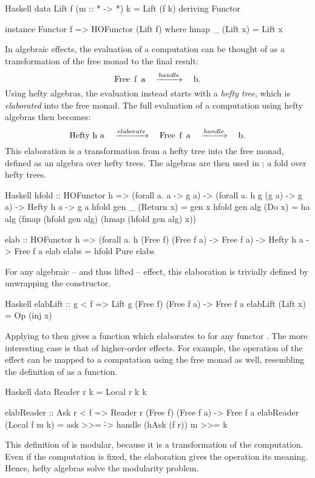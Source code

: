 \begin{lst}{Haskell}
data Lift f (m :: * -> *) k = Lift (f k)
  deriving Functor

instance Functor f => HOFunctor (Lift f) where
  hmap _ (Lift x) = Lift x
\end{lst}
%
In algebraic effects, the evaluation of a computation can be thought of as a transformation of the free monad to the final result: 
\[
    \mcode{Free f a} \quad\xrightarrow{handle}\quad \mcode{b}.
\]
Using hefty algebras, the evaluation instead starts with a \emph{hefty tree}, which is \emph{elaborated} into the free monad. The full evaluation of a computation using hefty algebras then becomes:
\[
    \mcode{Hefty h a} \quad\xrightarrow{elaborate}\quad \mcode{Free f a} \quad\xrightarrow{handle}\quad \mcode{b}.
\]
This elaboration is a transformation from a hefty tree into the free monad, defined as an algebra over hefty trees. The algebras are then used in ; a fold over hefty trees.

\begin{lst}{Haskell}
hfold :: HOFunctor h
      => (forall a. a -> g a)
      -> (forall a. h g (g a) -> g a)
      -> Hefty h a 
      -> g a
hfold gen _   (Return x) = gen x
hfold gen alg (Do x)     =
  ha alg (fmap (hfold gen alg) (hmap (hfold gen alg) x))

elab :: HOFunctor h
     => (forall a. h (Free f) (Free f a) -> Free f a)
     -> Hefty h a
     -> Free f a
elab elabs = hfold Pure elabs
\end{lst}
%
For any algebraic -- and thus lifted -- effect, this elaboration is trivially defined by unwrapping the  constructor.

\begin{lst}{Haskell}
elabLift :: g < f => Lift g (Free f) (Free f a) -> Free f a
elabLift (Lift x) = Op (inj x)
\end{lst}
%
Applying  to  then gives a function which elaborates  to  for any functor . The more interesting case is that of higher-order effects. For example, the  operation of the  effect can be mapped to a computation using the free monad as well, resembling the definition of  as a function.

\begin{lst}{Haskell}
data Reader r k = Local r k k

elabReader :: Ask r < f
           => Reader r (Free f) (Free f a)
           -> Free f a
elabReader (Local f m k) = ask >>= \r -> handle (hAsk (f r)) m >>= k
\end{lst}
%
This definition of  is modular, because it is a transformation of the computation. Even if the computation is fixed, the elaboration gives the  operation its meaning. Hence, hefty algebras solve the modularity problem.

